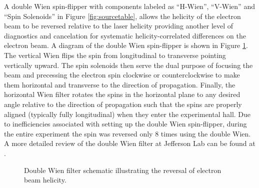 A double Wien spin-flipper with components labeled as ``H-Wien'', ``V-Wien'' and ``Spin Solenoids'' in Figure \ref{fig:sourcetable}, allows the helicity of the electron beam to be reversed relative to the laser helicity providing another level of diagnostics and cancelation for systematic helicity-correlated differences on the electron beam. A diagram of the double Wien spin-flipper is shown in Figure \ref{fig:double_wien}. The vertical Wien flips the spin from longitudinal to transverse pointing vertically upward. The spin solenoids then serve the dual purpose of focusing the beam and precessing the electron spin clockwise or counterclockwise to make them horizontal and transverse to the direction of propagation. Finally, the horizontal Wien filter rotates the spins in the horizontal plane to any desired angle relative to the direction of propagation such that the spins are properly aligned (typically fully longitudinal) when they enter the experimental hall. Due to inefficiencies associated with setting up the double Wien spin-flipper, during the entire \Qs experiment the spin was reversed only 8 times using the double Wien. A more detailed review of the double Wien filter at Jefferson Lab can be found at \cite{Adderley2011}.
\begin{figure}[ht]
\centering
{}
\caption{Double Wien filter schematic illustrating the reversal of electron beam helicity.}
\label{fig:double_wien}
\end{figure}

